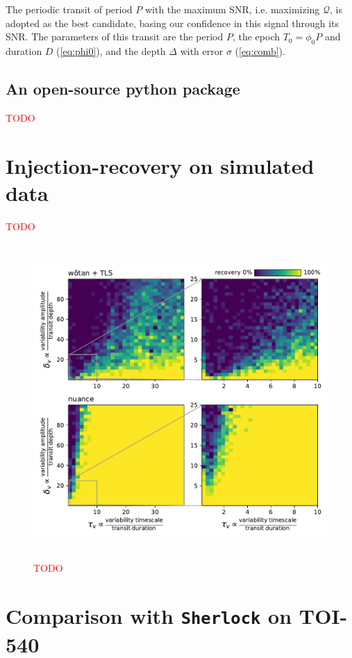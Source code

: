 \documentclass{aastex631}
\newcommand{\TODO}{\textcolor{red}{TODO}}
\begin{document}
The periodic transit of period $P$ with the maximum SNR, i.e. maximizing $\mathcal{Q}$, is adopted as the best candidate, basing our confidence in this signal through its SNR. The parameters of this transit are the period $P$, the epoch $T_0 = \phi_0 P$ and duration $D$ (\autoref{eq:phi0}), and the depth $\Delta$ with error $\sigma$ (\autoref{eq:comb}).

\newpage
\subsection{An open-source python package}
\TODO

\section{Injection-recovery on simulated data}\label{simu}
\TODO
\begin{figure}[H]
    \begin{centering}
        \includegraphics[height=12cm]{../../workflows/synthetic_injection_recovery/figures/final_result.pdf}
        \caption{\TODO}
        \label{fig:simu}
    \end{centering}
\end{figure}

\section{Comparison with \texttt{Sherlock} on TOI-540}\label{real}
\end{document}
